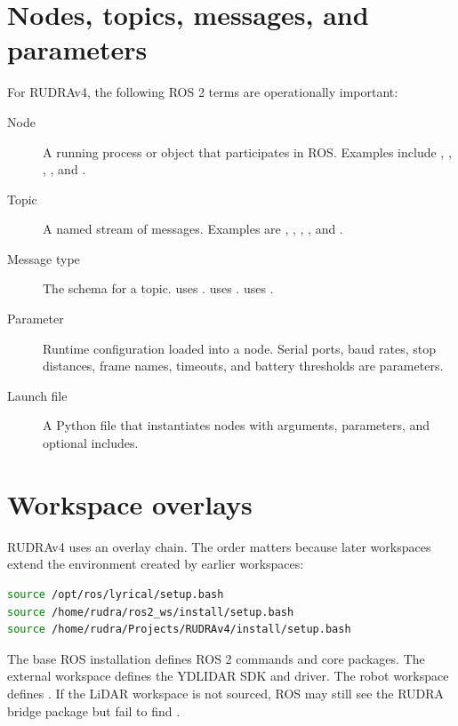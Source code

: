 \section{Nodes, topics, messages, and parameters}

For RUDRAv4, the following ROS 2 terms are operationally important:

\begin{description}
  \item[Node] A running process or object that participates in ROS. Examples include , , , , and .
  \item[Topic] A named stream of messages. Examples are , , , , and .
  \item[Message type] The schema for a topic.  uses .  uses .  uses .
  \item[Parameter] Runtime configuration loaded into a node. Serial ports, baud rates, stop distances, frame names, timeouts, and battery thresholds are parameters.
  \item[Launch file] A Python file that instantiates nodes with arguments, parameters, and optional includes.
\end{description}

\section{Workspace overlays}

RUDRAv4 uses an overlay chain. The order matters because later workspaces extend the environment created by earlier workspaces:

\begin{lstlisting}[language=bash]
source /opt/ros/lyrical/setup.bash
source /home/rudra/ros2_ws/install/setup.bash
source /home/rudra/Projects/RUDRAv4/install/setup.bash
\end{lstlisting}

The base ROS installation defines ROS 2 commands and core packages. The external workspace defines the YDLIDAR SDK and driver. The robot workspace defines . If the LiDAR workspace is not sourced, ROS may still see the RUDRA bridge package but fail to find .

